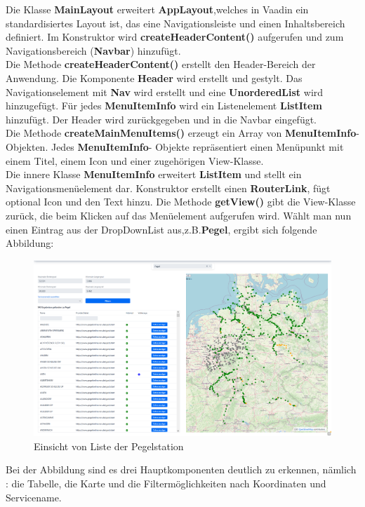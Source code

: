 \documentclass[a4paper,12pt]{scrreprt}
\begin{document}
Die Klasse \textbf{MainLayout} erweitert \textbf{AppLayout},welches in Vaadin ein standardisiertes Layout ist, das eine Navigationsleiste und einen Inhaltsbereich definiert. Im Konstruktor wird \textbf{createHeaderContent()} aufgerufen und zum Navigationsbereich (\textbf{Navbar}) hinzufügt.\\ 

Die Methode \textbf{createHeaderContent()} erstellt den Header-Bereich der Anwendung. Die Komponente \textbf{Header} wird erstellt und gestylt. Das Navigationselement mit \textbf{Nav} wird erstellt und eine \textbf{UnorderedList} wird hinzugefügt. Für jedes \textbf{MenuItemInfo} wird ein Listenelement \textbf{ListItem} hinzufügt. Der Header wird zurückgegeben und in die Navbar eingefügt.\\

Die Methode \textbf{createMainMenuItems()} erzeugt ein Array von \textbf{MenuItemInfo}- Objekten. Jedes \textbf{MenuItemInfo}- Objekte repräsentiert einen Menüpunkt mit einem Titel, einem Icon und einer zugehörigen View-Klasse. \\

Die innere Klasse \textbf{MenuItemInfo} erweitert \textbf{ListItem} und stellt ein Navigationsmenüelement dar. Konstruktor erstellt einen \textbf{RouterLink}, fügt optional Icon und den Text hinzu. Die Methode \textbf{getView()} gibt die View-Klasse zurück, die beim Klicken auf das Menüelement aufgerufen wird.
\clearpage
Wählt man nun einen Eintrag aus der DropDownList aus,z.B.\textbf{Pegel}, ergibt sich folgende Abbildung:
\begin{figure}[H]
	 \centering
	\includegraphics[width=18cm]{pegel.png}
	\caption{\label{pegel:}Einsicht von Liste der Pegelstation}
\end{figure}
Bei der Abbildung sind es drei Hauptkomponenten deutlich zu erkennen, nämlich : die Tabelle, die Karte und die Filtermöglichkeiten nach Koordinaten und Servicename.
\end{document}
